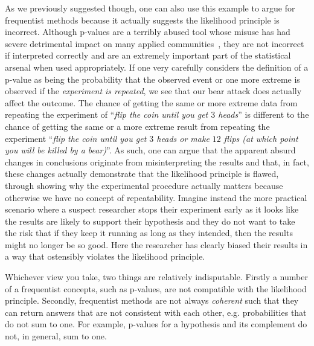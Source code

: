 As we previously suggested though, one can also use this example to argue for frequentist methods because it actually
suggests the likelihood principle is incorrect.  Although p-values are a terribly abused tool whose misuse has had
severe detrimental impact on many applied communities~\citep{goodman1999toward,ioannidis2005most}, they are not incorrect if 
interpreted correctly
and are an extremely important part of the statistical arsenal when used appropriately.  If one very carefully considers
the definition of a p-value as being the probability that the observed event or one more extreme is observed if the
\emph{experiment is repeated}, we see that our bear attack does actually affect the outcome.  The chance of getting the same
or more extreme data from repeating the experiment of ``\textit{flip the coin until you get $3$ heads}'' is different to 
the chance of getting the same or a more extreme result from repeating the experiment 
``\textit{flip the coin until you get $3$ heads or make $12$ flips (at which point you will be killed by a bear)}''.  
As such, one can argue that the apparent absurd
changes in conclusions originate from misinterpreting the results and that, in fact, these changes actually demonstrate
that the likelihood principle is flawed, through showing why the experimental procedure actually matters because otherwise
we have no concept of repeatability.  Imagine instead the more practical scenario where a suspect researcher stops their experiment
early as it looks like the results are likely to support their hypothesis and they do not want to take the risk that if they
keep it running as long as they intended, then the results might no longer be so good.  Here the researcher has clearly
biased their results in a way that ostensibly violates the likelihood principle.

Whichever view you take, two things are relatively indisputable.  Firstly a number of a frequentist concepts, such as p-values,
are not compatible with the likelihood principle.  Secondly, frequentist methods are not always \emph{coherent} such that they can
return answers that are not consistent with each other, e.g. probabilities that do not sum to one.  For example, p-values
for a hypothesis and its complement do not, in general, sum to one.  

